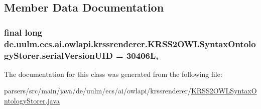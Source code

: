 \subsection{Member Data Documentation}
\hypertarget{classde_1_1uulm_1_1ecs_1_1ai_1_1owlapi_1_1krssrenderer_1_1_k_r_s_s2_o_w_l_syntax_ontology_storer_ae4a23b69251a1eeab87ed8506982c7e8}{
\subsubsection[{serial\-Version\-U\-I\-D}]{\setlength{\rightskip}{0pt plus 5cm}final long de.\-uulm.\-ecs.\-ai.\-owlapi.\-krssrenderer.\-K\-R\-S\-S2\-O\-W\-L\-Syntax\-Ontology\-Storer.\-serial\-Version\-U\-I\-D = 30406\-L\hspace{0.3cm}{\ttfamily [static]}, {\ttfamily [private]}}}\label{classde_1_1uulm_1_1ecs_1_1ai_1_1owlapi_1_1krssrenderer_1_1_k_r_s_s2_o_w_l_syntax_ontology_storer_ae4a23b69251a1eeab87ed8506982c7e8}


The documentation for this class was generated from the following file\-:\begin{DoxyCompactItemize}
\item 
parsers/src/main/java/de/uulm/ecs/ai/owlapi/krssrenderer/\hyperlink{_k_r_s_s2_o_w_l_syntax_ontology_storer_8java}{K\-R\-S\-S2\-O\-W\-L\-Syntax\-Ontology\-Storer.\-java}\end{DoxyCompactItemize}

